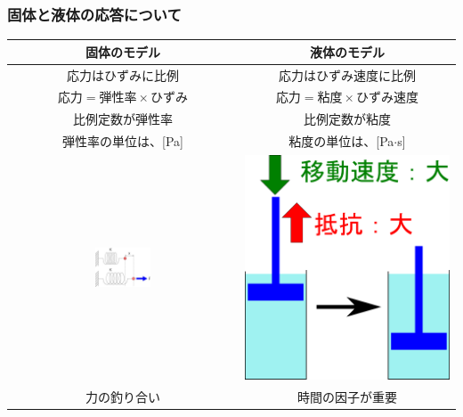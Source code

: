 \documentclass[unicode,12pt]{beamer}%
\begin{document}
\begin{frame}
	\frametitle{固体と液体の応答について}
			\begin{center}
				\begin{tabular}{|c||c|} \hline
					固体のモデル	& 液体のモデル \\ \hline \hline
					応力は\alert{ひずみに比例}	& 応力は\alert{ひずみ速度に比例}\\
					$\text{応力} = \text{弾性率} \times \text{ひずみ}$	& $\text{応力} = \text{粘度} \times \text{ひずみ速度}$ \\ \hline
					比例定数が弾性率	& 比例定数が粘度\\ 
					弾性率の単位は、[Pa]	& 粘度の単位は、[Pa$\cdot$s]\\ \hline
					\includegraphics[width= 0.25\textwidth]{spring.png} & \includegraphics[width=.25\textwidth]{dashpot.png} \\ \hline
					\alert{力の釣り合い}	& 	\alert{時間の因子が重要} \\ \hline
				\end{tabular}
			\end{center}
\end{frame}
\end{document}
